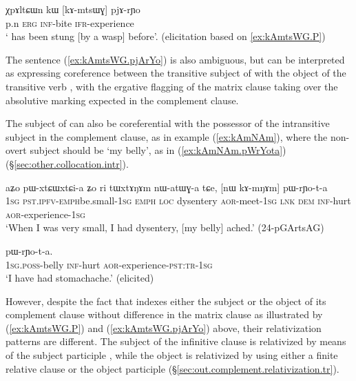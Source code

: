 \begin{exe}
\ex   \label{ex:kAmtsWG.pjArYo} 
\gll χpɤltɕɯn kɯ [kɤ-mtsɯɣ]  pjɤ-rɲo  \\
 p.n \textsc{erg} \textsc{inf}-bite \textsc{ifr}-experience \\
\glt ` has been stung [by a wasp] before'. (elicitation based on \ref{ex:kAmtsWG.P})
\end{exe} 

The sentence (\ref{ex:kAmtsWG.pjArYo}) is also ambiguous, but can be interpreted as expressing coreference between the transitive subject of  with the object of the transitive verb , with the ergative flagging of the matrix clause taking over the absolutive marking expected in the complement clause.


The subject of  can also be coreferential with the possessor of the intransitive subject in the complement clause, as in example (\ref{ex:kAmNAm}), where the non-overt subject should be  `my belly', as in (\ref{ex:kAmNAm.pWrYota}) (§\ref{sec:other.collocation.intr}).
 
 \begin{exe}
\ex \label{ex:kAmNAm}
\gll aʑo pɯ-xtɕɯ\redp{}xtɕi-a ʑo ri tɯxtɤŋɤm nɯ-atɯɣ-a tɕe, [nɯ kɤ-mŋɤm] pɯ-rɲo-t-a \\
\textsc{1sg} \textsc{pst}.\textsc{ipfv}-\textsc{emph}\redp{}be.small-\textsc{1sg} \textsc{emph} \textsc{loc} dysentery \textsc{aor}-meet-\textsc{1sg} \textsc{lnk} \textsc{dem} \textsc{inf}-hurt \textsc{aor}-experience-\textsc{1sg} \\
\glt `When I was very small, I had dysentery, [my belly] ached.'  (24-pGArtsAG)
\end{exe}

\begin{exe} 
\ex \label{ex:kAmNAm.pWrYota}
 pɯ-rɲo-t-a. \\
\textsc{1sg}.\textsc{poss}-belly \textsc{inf}-hurt \textsc{aor}-experience-\textsc{pst}:\textsc{tr}-\textsc{1sg} \\
\glt `I have had stomachache.' (elicited)
\end{exe} 

However, despite the fact that  indexes either the subject or the object of its complement clause without difference in the matrix clause as illustrated by (\ref{ex:kAmtsWG.P}) and (\ref{ex:kAmtsWG.pjArYo}) above, their relativization patterns are different. The subject of the infinitive clause is relativized by means of the subject participle , while the object is relativized by using either a finite relative clause or the object participle  (§\ref{sec:out.complement.relativization.tr}). 

